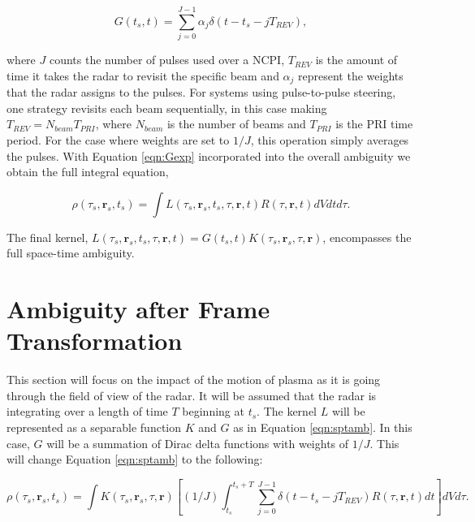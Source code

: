 \begin{equation}
\label{eqn:Gexp}
G(t_s,t) = \displaystyle \sum_{j=0}^{J-1}\alpha_j \delta(t-t_s-jT_{REV}),
\end{equation}

\noindent where $J$ counts the number of pulses used over a NCPI, $T_{REV}$ is the amount of time it takes the radar to revisit the specific beam and $\alpha_j$ represent the weights that the radar assigns to the pulses. For systems using pulse-to-pulse steering, one strategy revisits each beam sequentially, in this case making $T_{REV}=N_{beam}T_{PRI}$, where $N_{beam}$ is the number of beams and $T_{PRI}$ is the PRI time period. For the case where weights are set to $1/J$, this operation simply averages the pulses. With Equation \ref{eqn:Gexp} incorporated into the overall ambiguity we obtain the full integral equation,

\begin{equation}
\label{eqn:sptamb}
	\rho(\tau_s,\mathbf{r}_s,t_s) =\int L(\tau_s,\mathbf{r}_s,t_s,\tau,\mathbf{r},t)R(\tau,\mathbf{r},t)dVdtd\tau.
\end{equation}

\noindent The final kernel, $L(\tau_s,\mathbf{r}_s,t_s,\tau,\mathbf{r},t) = G(t_s,t)K(\tau_s,\mathbf{r}_s,\tau,\mathbf{r})$, encompasses the full space-time ambiguity.

\section{Ambiguity after Frame Transformation}
\label{sec:frametrans}

This section will focus on the impact of the motion of plasma as it is going through the field of view of the radar. It will be assumed that the radar is integrating over a length of time $T$ beginning at $t_s$. The kernel $L$ will be represented as a separable function $K$ and $G$ as in Equation \ref{eqn:sptamb}. In this case, $G$ will be a summation of Dirac delta functions with weights of $1/J$. This will change Equation \ref{eqn:sptamb} to the following:

\begin{equation}
\label{eqn:L2}
\rho(\tau_s,\mathbf{r}_s,t_s) = \int K(\tau_s,\mathbf{r}_s,\tau,\mathbf{r}) \left[(1/J)\int_{t_s}^{t_s+T} \displaystyle \sum_{j=0}^{J-1} \delta(t-t_s-jT_{REV})R(\tau,\mathbf{r},t) dt\right] dVd\tau.
\end{equation}

